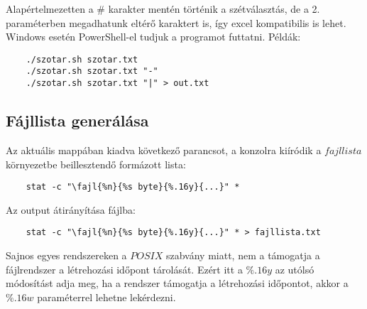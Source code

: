 \documentclass[]{article}
\begin{document}
Alapértelmezetten a $\#$ karakter mentén történik a szétválasztás, de a 2. paraméterben megadhatunk eltérő karaktert is, így excel kompatibilis is lehet. Windows esetén PowerShell-el tudjuk a programot futtatni. Példák:
\begin{verbatim}
    ./szotar.sh szotar.txt
    ./szotar.sh szotar.txt "-"
    ./szotar.sh szotar.txt "|" > out.txt
\end{verbatim}
\subsection{Fájllista generálása}
Az aktuális mappában kiadva következő parancsot, a konzolra kiíródik a $fajllista$ környezetbe beillesztendő formázott lista: 
\begin{verbatim}
    stat -c "\fajl{%n}{%s byte}{%.16y}{...}" *
\end{verbatim}
Az output átirányítása fájlba:
\begin{verbatim}
    stat -c "\fajl{%n}{%s byte}{%.16y}{...}" * > fajllista.txt
\end{verbatim}

Sajnos egyes rendszereken a $POSIX$ szabvány miatt, nem a támogatja a fájlrendszer a létrehozási időpont tárolását. Ezért itt a $\%.16y$ az utólsó módosítást adja meg, ha a rendszer támogatja a létrehozási időpontot, akkor a $\%.16w$ paraméterrel lehetne lekérdezni.
\end{document}
